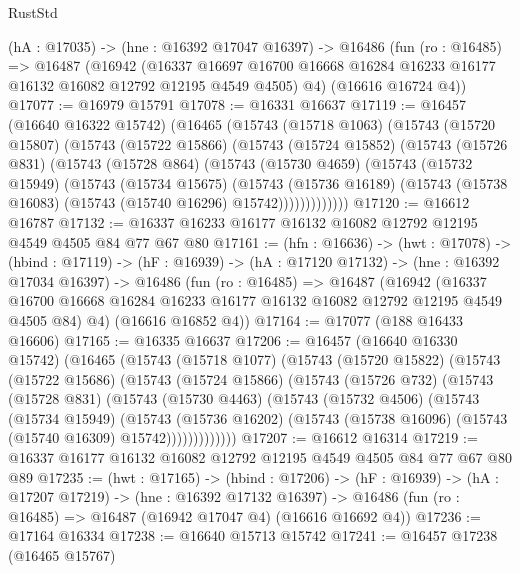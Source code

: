 \begin{lexlean}{RustStd}
\begin{coremodule}
  (hA : @17035) ->
  (hne : @16392 @17047 @16397) ->
  @16486
    (fun (ro : @16485) =>
    @16487
      (@16942
        (@16337 @16697 @16700 @16668 @16284 @16233 @16177 @16132 @16082 @12792 @12195 @4549 @4505)
        @4)
      (@16616 @16724 @4))
@17077 := @16979 @15791
@17078 := @16331 @16637
@17119 := @16457
    (@16640 @16322 @15742)
    (@16465
      (@15743
        (@15718 @1063)
        (@15743
          (@15720 @15807)
          (@15743
            (@15722 @15866)
            (@15743
              (@15724 @15852)
              (@15743
                (@15726 @831)
                (@15743
                  (@15728 @864)
                  (@15743
                    (@15730 @4659)
                    (@15743
                      (@15732 @15949)
                      (@15743
                        (@15734 @15675)
                        (@15743
                          (@15736 @16189)
                          (@15743 (@15738 @16083) (@15743 (@15740 @16296) @15742)))))))))))))
@17120 := @16612 @16787
@17132 := @16337 @16233 @16177 @16132 @16082 @12792 @12195 @4549 @4505 @84 @77 @67 @80
@17161 := (hfn : @16636) ->
  (hwt : @17078) ->
  (hbind : @17119) ->
  (hF : @16939) ->
  (hA : @17120 @17132) ->
  (hne : @16392 @17034 @16397) ->
  @16486
    (fun (ro : @16485) =>
    @16487
      (@16942
        (@16337 @16700 @16668 @16284 @16233 @16177 @16132 @16082 @12792 @12195 @4549 @4505 @84)
        @4)
      (@16616 @16852 @4))
@17164 := @17077 (@188 @16433 @16606)
@17165 := @16335 @16637
@17206 := @16457
    (@16640 @16330 @15742)
    (@16465
      (@15743
        (@15718 @1077)
        (@15743
          (@15720 @15822)
          (@15743
            (@15722 @15686)
            (@15743
              (@15724 @15866)
              (@15743
                (@15726 @732)
                (@15743
                  (@15728 @831)
                  (@15743
                    (@15730 @4463)
                    (@15743
                      (@15732 @4506)
                      (@15743
                        (@15734 @15949)
                        (@15743
                          (@15736 @16202)
                          (@15743 (@15738 @16096) (@15743 (@15740 @16309) @15742)))))))))))))
@17207 := @16612 @16314
@17219 := @16337 @16177 @16132 @16082 @12792 @12195 @4549 @4505 @84 @77 @67 @80 @89
@17235 := (hwt : @17165) ->
  (hbind : @17206) ->
  (hF : @16939) ->
  (hA : @17207 @17219) ->
  (hne : @16392 @17132 @16397) ->
  @16486 (fun (ro : @16485) => @16487 (@16942 @17047 @4) (@16616 @16692 @4))
@17236 := @17164 @16334
@17238 := @16640 @15713 @15742
@17241 := @16457 @17238 (@16465 @15767)

\end{coremodule}
\end{lexlean}
